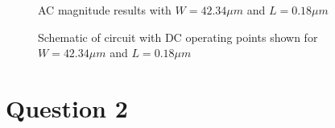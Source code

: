 \documentclass[12pt, letterpaper, notitlepage, DIV=16, BCOR=1mm, headlines=2]{scrreprt}
\begin{document}
\begin{figure}[h]
	\caption{AC magnitude results with $W=42.34\mu m$ and $L=0.18\mu m$}
	\label{fig:ACmag2}
\end{figure}
\begin{figure}[h]
	\caption{Schematic of circuit with DC operating points shown for $W=42.34\mu m$ and $L=0.18\mu m$}
	\label{fig:schematicB}
\end{figure}

\section*{Question 2}
\end{document}
